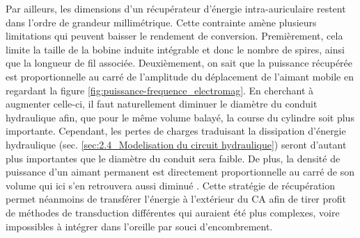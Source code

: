Par ailleurs, les dimensions d'un récupérateur d'énergie intra-auriculaire restent dans l'ordre de grandeur millimétrique. Cette contrainte amène plusieurs limitations qui peuvent baisser le rendement de conversion. Premièrement, cela limite la taille de la bobine induite intégrable et donc le nombre de spires, ainsi que la longueur de fil associée. Deuxièmement, on sait que la puissance récupérée est proportionnelle au carré de l'amplitude du déplacement de l'aimant mobile en regardant la figure \ref{fig:puissance-frequence_electromag}. En cherchant à augmenter celle-ci, il faut naturellement diminuer le diamètre du conduit hydraulique afin, que pour le même volume balayé, la course du cylindre soit plus importante. Cependant, les pertes de charges traduisant la dissipation d'énergie hydraulique (sec. \ref{sec:2.4_Modelisation du circuit hydraulique}) seront d'autant plus importantes que le diamètre du conduit sera faible. De plus, la densité de puissance d'un aimant permanent est directement proportionnelle au carré de son volume qui ici s'en retrouvera aussi diminué \cite{Priya2017}. Cette stratégie de récupération permet néanmoins de transférer l'énergie à l'extérieur du CA afin de tirer profit de méthodes de transduction différentes qui auraient été plus complexes, voire impossibles à intégrer dans l'oreille par souci d'encombrement.

